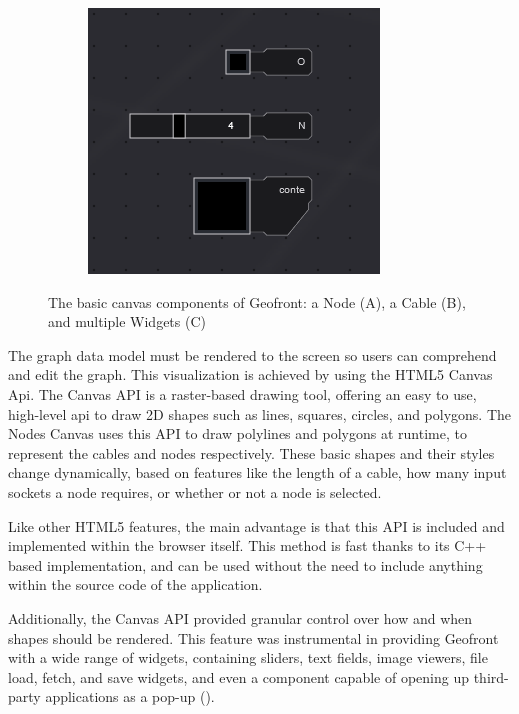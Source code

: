 \begin{figure}
\begin{subfigure}[b]{0.30\linewidth}
    \graphicspath{ {../../assets/images/implementation/} }
    \centering
    \includegraphics[width=\linewidth]{widgets.png}
    \caption{}\label{fig:node-cable:3}
  \end{subfigure}%
  \caption{The basic canvas components of Geofront: a Node (A), a Cable (B), and multiple Widgets (C) }
  \label{fig:node-cable}
\end{figure}

The graph data model must be rendered to the screen so users can comprehend and edit the graph. 
This visualization is achieved by using the HTML5 Canvas Api. 
The Canvas API is a raster-based drawing tool, offering an easy to use, high-level api to draw 2D shapes such as lines, squares, circles, and polygons. 
The Nodes Canvas uses this API to draw polylines and polygons at runtime, to represent the cables and nodes respectively. 
These basic shapes and their styles change dynamically, based on features like the length of a cable, how many input sockets a node requires, or whether or not a node is selected. 

Like other HTML5 features, the main advantage is that this API is included and implemented within the browser itself. This method is fast thanks to its C++ based implementation, and can be used without the need to include anything within the source code of the application.

Additionally, the Canvas API provided granular control over how and when shapes should be rendered. 
This feature was instrumental in providing Geofront with a wide range of widgets, containing sliders, text fields, image viewers, file load, fetch, and save widgets, and even a component capable of opening up third-party applications as a pop-up (). 

